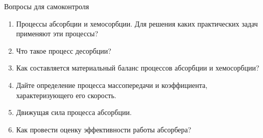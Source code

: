 Вопросы для самоконтроля
\begin{enumerate}
	\item Процессы абсорбции и хемосорбции. Для решения каких практических задач применяют эти процессы?
	\item Что такое процесс десорбции?
	\item Как составляется материальный баланс процессов абсорбции и хемосорбции?
	\item Дайте определение процесса массопередачи и коэффициента, характеризующего его скорость.
	\item Движущая сила процесса абсорбции.
	\item Как провести оценку эффективности работы абсорбера?
\end{enumerate}